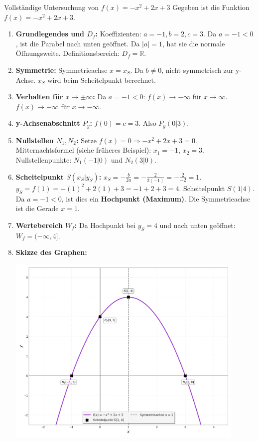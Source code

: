 \begin{beispielumgebung}{Vollständige Untersuchung von $f(x) = -x^2 + 2x + 3$}
Gegeben ist die Funktion $f(x) = -x^2 + 2x + 3$.

\begin{enumerate}
    \item \textbf{Grundlegendes und $D_f$:} Koeffizienten: $a=-1, b=2, c=3$.
    Da $a=-1 < 0$, ist die Parabel nach unten geöffnet. Da $|a|=1$, hat sie die normale Öffnungsweite.
    Definitionsbereich: $D_f = \mathbb{R}$.
    \item \textbf{Symmetrie:} Symmetrieachse $x=x_S$. Da $b \neq 0$, nicht symmetrisch zur y-Achse. $x_S$ wird beim Scheitelpunkt berechnet.
    \item \textbf{Verhalten für $x \to \pm \infty$:} Da $a=-1 < 0$:
    $f(x) \to -\infty$ für $x \to \infty$.
    $f(x) \to -\infty$ für $x \to -\infty$.
    \item \textbf{y-Achsenabschnitt $P_y$:} $f(0) = c = 3$. Also $P_y(0|3)$.
    \item \textbf{Nullstellen $N_1, N_2$:} Setze $f(x)=0 \Rightarrow -x^2+2x+3=0$.
    Mitternachtsformel (siehe früheres Beispiel): $x_1 = -1$, $x_2 = 3$.
    Nullstellenpunkte: $N_1(-1|0)$ und $N_2(3|0)$.
    \item \textbf{Scheitelpunkt $S(x_S|y_S)$:}
    $x_S = -\frac{b}{2a} = -\frac{2}{2(-1)} = -\frac{2}{-2} = 1$.
    $y_S = f(1) = -(1)^2 + 2(1) + 3 = -1 + 2 + 3 = 4$.
    Scheitelpunkt $S(1|4)$. Da $a=-1 < 0$, ist dies ein \textbf{Hochpunkt (Maximum)}.
    Die Symmetrieachse ist die Gerade $x=1$.
    \item \textbf{Wertebereich $W_f$:} Da Hochpunkt bei $y_S=4$ und nach unten geöffnet: $W_f = (-\infty, 4]$.
    \item \textbf{Skizze des Graphen:}
\begin{center}
    \includegraphics[width=0.9\textwidth]{grafiken/Quadratische_Kurvendiskussion_Beispiel.png}
    \label{fig:kurvendisk_beispiel}
\end{center}
\end{enumerate}
\end{beispielumgebung}

